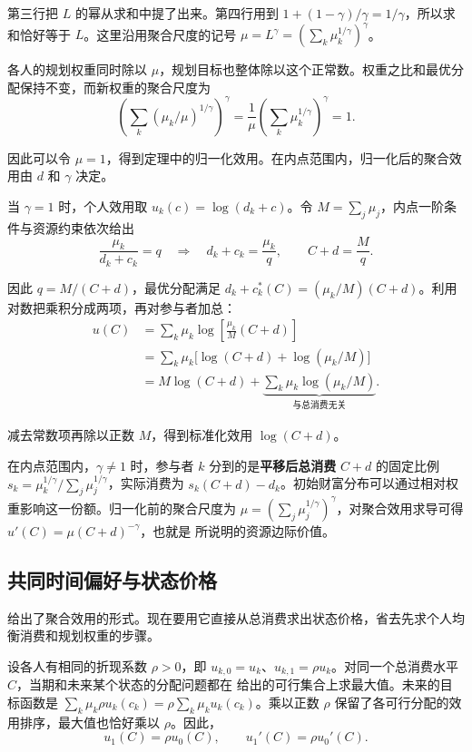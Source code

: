 \begin{solution}[label-content={证明},blank-type=none]
第三行把 $L$ 的幂从求和中提了出来。第四行用到 $1+(1-\gamma)/\gamma=1/\gamma$，所以求和恰好等于 $L$。这里沿用聚合尺度的记号 $\mu=L^\gamma=(\sum_k\mu_k^{1/\gamma})^\gamma$。

各人的规划权重同时除以 $\mu$，规划目标也整体除以这个正常数。权重之比和最优分配保持不变，而新权重的聚合尺度为
\[
 \left(\sum_k(\mu_k/\mu)^{1/\gamma}\right)^\gamma
 =\frac{1}{\mu}\left(\sum_k\mu_k^{1/\gamma}\right)^\gamma=1.
\]

因此可以令 $\mu=1$，得到定理中的归一化效用。在内点范围内，归一化后的聚合效用由 $d$ 和 $\gamma$ 决定。

当 $\gamma=1$ 时，个人效用取 $u_k(c)=\log(d_k+c)$。令 $M=\sum_j\mu_j$，内点一阶条件与资源约束依次给出
\[
 \frac{\mu_k}{d_k+c_k}=q
 \quad\Longrightarrow\quad
 d_k+c_k=\frac{\mu_k}{q},
 \qquad
 C+d=\frac{M}{q}.
\]

因此 $q=M/(C+d)$，最优分配满足 $d_k+c_k^*(C)=(\mu_k/M)(C+d)$。利用对数把乘积分成两项，再对参与者加总：
\[
 \begin{aligned}
 u(C)
 &=\sum_k\mu_k\log\left[\frac{\mu_k}{M}(C+d)\right]\\
 &=\sum_k\mu_k\bigl[\log(C+d)+\log(\mu_k/M)\bigr]\\
 &=M\log(C+d)+
   \underbrace{\sum_k\mu_k\log(\mu_k/M)}_{\text{与总消费无关}}.
 \end{aligned}
\]

减去常数项再除以正数 $M$，得到标准化效用 $\log(C+d)$。
\end{solution}

在内点范围内，$\gamma\ne1$ 时，参与者 $k$ 分到的是\textbf{平移后总消费} $C+d$ 的固定比例 $s_k=\mu_k^{1/\gamma}/\sum_j\mu_j^{1/\gamma}$，实际消费为 $s_k(C+d)-d_k$。初始财富分布可以通过相对权重影响这一份额。归一化前的聚合尺度为 $\mu=(\sum_j\mu_j^{1/\gamma})^\gamma$，对聚合效用求导可得 $u'(C)=\mu(C+d)^{-\gamma}$，也就是 所说明的资源边际价值。

\subsection{共同时间偏好与状态价格}\label{sec:wj-ten-common-discount}
 给出了聚合效用的形式。现在要用它直接从总消费求出状态价格，省去先求个人均衡消费和规划权重的步骤。

设各人有相同的折现系数 $\rho>0$，即 $u_{k,0}=u_k$、$u_{k,1}=\rho u_k$。对同一个总消费水平 $C$，当期和未来某个状态的分配问题都在 给出的可行集合上求最大值。未来的目标函数是 $\sum_k\mu_k\rho u_k(c_k)=\rho\sum_k\mu_ku_k(c_k)$。乘以正数 $\rho$ 保留了各可行分配的效用排序，最大值也恰好乘以 $\rho$。因此，
\[
 u_1(C)=\rho u_0(C),\qquad
 u_1'(C)=\rho u_0'(C).
\]

